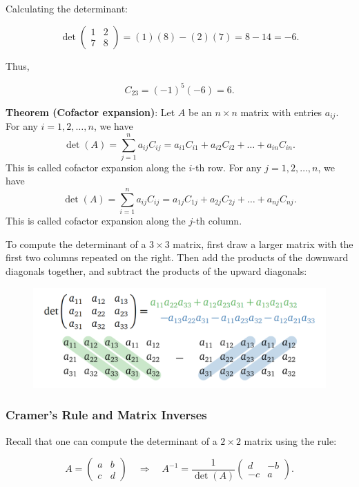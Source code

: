 \documentclass[a4paper,12pt]{article}
\begin{document}
Calculating the determinant:

\[
\det \begin{pmatrix} 1 & 2 \\ 7 & 8 \end{pmatrix} = (1)(8) - (2)(7) = 8 - 14 = -6.
\]

Thus,

\[
C_{23} = (-1)^{5} (-6) = 6.
\]

\textbf{Theorem (Cofactor expansion)}: Let \( A \) be an \( n \times n \) matrix with entries \( a_{ij} \). For any \( i = 1, 2, \dots, n \), we have
\[
\det(A) = \sum_{j=1}^{n} a_{ij} C_{ij} = a_{i1} C_{i1} + a_{i2} C_{i2} + \dots + a_{in} C_{in}.
\]
This is called cofactor expansion along the \( i \)-th row. For any \( j = 1, 2, \dots, n \), we have
\[
\det(A) = \sum_{i=1}^{n} a_{ij} C_{ij} = a_{1j} C_{1j} + a_{2j} C_{2j} + \dots + a_{nj} C_{nj}.
\]
This is called cofactor expansion along the \( j \)-th column.
\begin{tcolorbox}[title=Recipe: Computing the Determinant of a \( 3 \times 3 \) Matrix,colframe=blue!70!black, colback=blue!5!white]
To compute the determinant of a \( 3 \times 3 \) matrix, first draw a larger matrix with the first two columns repeated on the right. Then add the products of the downward diagonals together, and subtract the products of the upward diagonals:
\begin{figure}[H]
    \centering
    \includegraphics[width=1\linewidth]{detOfA3x3Matrix.png}
    
    \label{fig:det3}
\end{figure}
\end{tcolorbox}

\subsubsection{Cramer’s Rule and Matrix Inverses}

Recall that one can compute the determinant of a \( 2 \times 2 \) matrix using the rule:

\[
A = \begin{pmatrix} a & b \\ c & d \end{pmatrix} \quad \Rightarrow \quad A^{-1} = \frac{1}{\det(A)} \begin{pmatrix} d & -b \\ -c & a \end{pmatrix}.
\]
\end{document}
